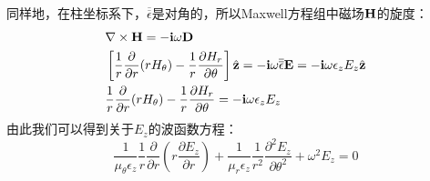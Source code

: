 同样地，在柱坐标系下，$\overline{\overline\epsilon}$是对角的，所以Maxwell方程组中磁场$\bf H$的旋度：
\begin{subequations}
  \begin{align}
    &\nabla\times{\bf H}=-\mathbf{i}\omega{\bf D}\\
    &\left[\frac{1}{r}\frac{\partial}{\partial
        r}(rH_\theta)-\frac{1}{r}\frac{\partial
        H_r}{\partial\theta}\right]{\hat{\bf
        z}}=-\mathbf{i}\omega{\overline{\overline\epsilon}}{\bf
      E}=-\mathbf{i}\omega\epsilon_zE_z{\hat{\bf z}} \\
    &\frac{1}{r}\frac{\partial}{\partial
      r}(rH_\theta)-\frac{1}{r}\frac{\partial
      H_r}{\partial\theta}=-\mathbf{i}\omega\epsilon_zE_z
  \end{align}
\end{subequations}
由此我们可以得到关于$E_z$的波函数方程：
\begin{equation}
  \frac{1}{\mu_\theta\epsilon_z}\frac{1}{r}\frac{\partial}{\partial r}
  \left(r\frac{\partial E_z}{\partial r}\right)+
  \frac{1}{\mu_r\epsilon_z}\frac{1}{r^2}\frac{\partial^2E_z}{\partial\theta^2}
  +\omega^2 E_z=0
\end{equation}
